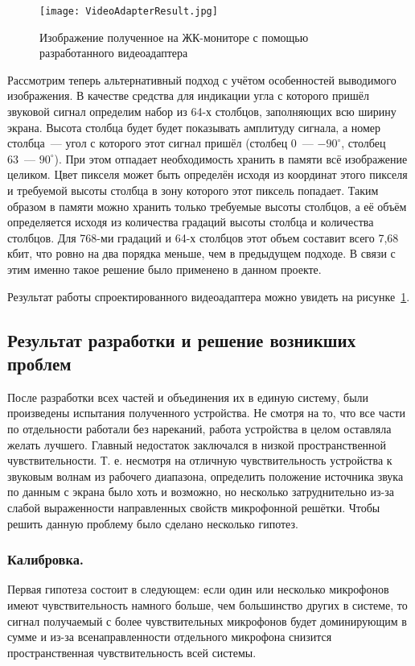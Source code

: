 \begin{figure}[ht]
	\centering
	\texttt{[image: VideoAdapterResult.jpg]}  
	\caption{Изображение полученное на ЖК-мониторе с помощью разработанного видеоадаптера}
	\label{fig:VideoAdapterResult}
\end{figure}

Рассмотрим теперь альтернативный подход с учётом особенностей выводимого изображения. В качестве средства для индикации угла с которого пришёл звуковой сигнал определим набор из 64-х столбцов, заполняющих всю ширину экрана. Высота столбца будет будет показывать амплитуду сигнала, а номер столбца~--- угол с которого этот сигнал пришёл (столбец 0~--- $-90^{\circ}$, столбец 63~--- $90^{\circ}$). При этом отпадает необходимость хранить в памяти всё изображение целиком. Цвет пикселя может быть определён исходя из координат этого пикселя и требуемой высоты столбца в зону которого этот пиксель попадает. Таким образом в памяти можно хранить только требуемые высоты столбцов, а её объём определяется исходя из количества градаций высоты столбца и количества столбцов. Для 768-ми градаций и 64-х столбцов этот объем составит всего 7,68 кбит, что ровно на два порядка меньше, чем в предыдущем подходе. В связи с этим именно такое решение было применено в данном проекте.

Результат работы спроектированного видеоадаптера можно увидеть на рисунке~\ref{fig:VideoAdapterResult}.

\subsection{Результат разработки и решение возникших проблем}
\label{section:ResultAndProblems}
После разработки всех частей и объединения их в единую систему, были произведены испытания полученного устройства. Не смотря на то, что все части по отдельности работали без нареканий, работа устройства в целом оставляла желать лучшего. Главный недостаток заключался в низкой пространственной чувствительности. Т. е. несмотря на отличную чувствительность устройства к звуковым волнам из рабочего диапазона, определить положение источника звука по данным с экрана было хоть и возможно, но несколько затруднительно из-за слабой выраженности направленных свойств микрофонной решётки. Чтобы решить данную проблему было сделано несколько гипотез.

\subsubsection{Калибровка. }
Первая гипотеза состоит в следующем: если один или несколько микрофонов имеют чувствительность намного больше, чем большинство других в системе, то сигнал получаемый с более чувствительных микрофонов будет доминирующим в сумме и из-за всенаправленности отдельного микрофона снизится пространственная чувствительность всей системы.

